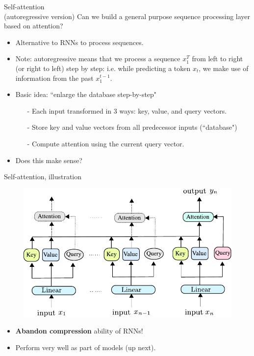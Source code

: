 \begin{frame}{Self-attention\\ (autoregressive version)}
Can we build a general purpose sequence processing layer based on attention?
\begin{itemize}
\item Alternative to RNNs to process sequences.
\pause
\item {\small Note: autoregressive means that we process a sequence $x_1^T$ from left to right (or right to left) step by step:
i.e. while predicting a token $x_t$, we make use of information from the past $x_1^{t-1}$.}
\pause
\item Basic idea: ``enlarge the database step-by-step"\\
\begin{itemize}
\item[-] Each input transformed in 3 ways: key, value, and query vectors.
\item[-] Store key and value vectors from all predecessor inputs (``database")
\item[-] Compute attention using the current query vector.
\end{itemize}
\pause
\item Does this make sense?
\end{itemize}
\end{frame}

\begin{frame}{Self-attention, illustration}
\begin{figure}
\hspace{-10mm}
                        \centering
                        \includegraphics[width=.7\linewidth]{./figures/self_attention_only.pdf}
\end{figure}
\begin{itemize}
\item \textbf{Abandon compression} ability of RNNs!
\item Perform very well as part of  models (up next).
\end{itemize}
\end{frame}

